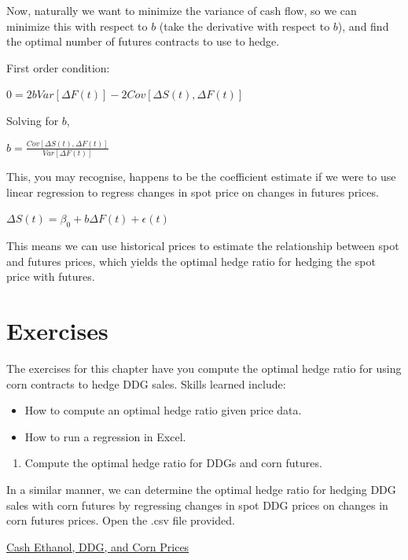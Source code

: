 \documentclass[
]{book}
\providecommand{\tightlist}{%
  \setlength{\itemsep}{0pt}\setlength{\parskip}{0pt}}
\begin{document}
Now, naturally we want to minimize the variance of cash flow, so we can minimize this with respect to \(b\) (take the derivative with respect to \(b\)), and find the optimal number of futures contracts to use to hedge.

First order condition:

\(0 = 2bVar[\Delta F(t)] - 2Cov[\Delta S(t),\Delta F(t)]\)

Solving for \(b\),

\(b = \frac{Cov[\Delta S(t),\Delta F(t)]}{Var[\Delta F(t)]}\)

This, you may recognise, happens to be the coefficient estimate if we were to use linear regression to regress changes in spot price on changes in futures prices.

\(\Delta S(t) = \beta_0 + b\Delta F(t) + \epsilon(t)\)

This means we can use historical prices to estimate the relationship between spot and futures prices, which yields the optimal hedge ratio for hedging the spot price with futures.

\hypertarget{exercises-7}{%
\section{Exercises}\label{exercises-7}}

The exercises for this chapter have you compute the optimal hedge ratio for using corn contracts to hedge DDG sales. Skills learned include:

\begin{itemize}
\item
  How to compute an optimal hedge ratio given price data.
\item
  How to run a regression in Excel.
\end{itemize}

\begin{enumerate}
\def\labelenumi{\arabic{enumi}.}
\tightlist
\item
  Compute the optimal hedge ratio for DDGs and corn futures.
\end{enumerate}

In a similar manner, we can determine the optimal hedge ratio for hedging DDG sales with corn futures by regressing changes in spot DDG prices on changes in corn futures prices. Open the .csv file provided.

\href{http://mindymallory.github.io/PriceAnalysis/Excel-files/Ethanol-Prices.csv}{Cash Ethanol, DDG, and Corn Prices}
\end{document}
